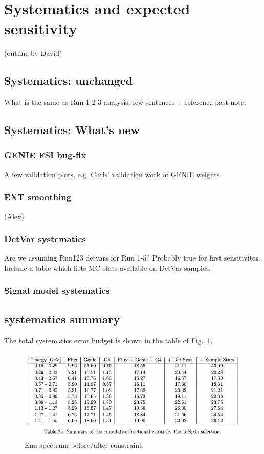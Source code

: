 \section{Systematics and expected sensitivity}
(outline by David)

\subsection{Systematics: unchanged}What is the same as Run 1-2-3 analysis: few sentences + reference past note.
\subsection{Systematics: What's new}
\subsubsection{GENIE FSI bug-fix} A few validation plots, e.g. Chris' validation work of GENIE weights.
\subsubsection{EXT smoothing} (Alex)
\subsubsection{DetVar systematics} Are we assuming Run123 detvars for Run 1-5? Probably true for first sensitivites. \\
Include a table which lists MC stats available on DetVar samples.
\subsubsection{Signal model systematics}

\subsection{systematics summary}

The total systematics error budget is shown in the table of Fig.~\ref{fig:systematicsbudget}.

\begin{center}
\begin{figure}[h]
    \includegraphics[width=1.00\textwidth]{technote/SystematicsSensitivity/Figures/systematicsbudget.png}
    \caption{Enu spectrum before/after constraint.}
    \label{fig:systematicsbudget}
\end{figure}
\end{center}


